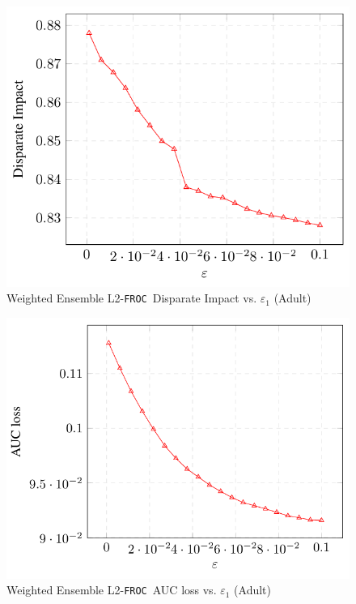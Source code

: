 \documentclass{article}
\newcommand{\ouralgo}{\texttt{FROC}}
\begin{document}
\begin{figure}[!h]
    \centering
    \includegraphics[width=1\linewidth]{Images/WEL2_Adult_DI.png}
    \caption{Weighted Ensemble L2-\ouralgo\  Disparate Impact vs. $\varepsilon_1$ (Adult)}
    \label{fig:WEL2_Adult_DI}
\end{figure}

\begin{figure}[!h]
    \centering
    \includegraphics[width=1\linewidth]{Images/WEL2_Adult_AUC.png}
    \caption{Weighted Ensemble L2-\ouralgo\ AUC loss vs. $\varepsilon_1$ (Adult)}
    \label{fig:WEL2_Adult_AUC}
\end{figure}
\end{document}
